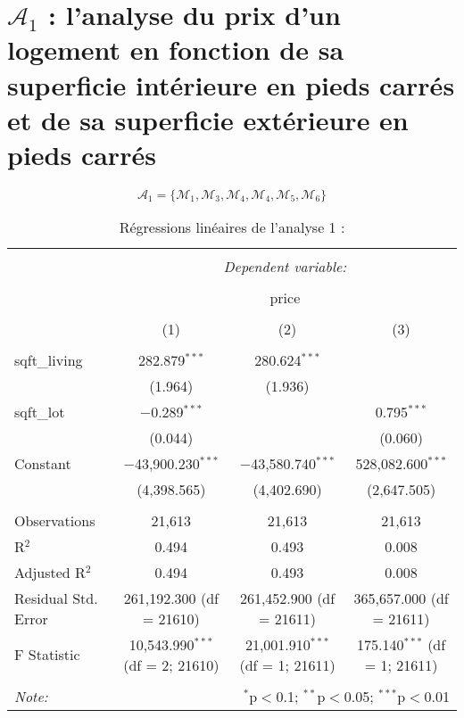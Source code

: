 \documentclass[
  11pt,
  french,
]{article}
\begin{document}
\newpage

\hypertarget{mathcala_1-lanalyse-du-prix-dun-logement-en-fonction-de-sa-superficie-intuxe9rieure-en-pieds-carruxe9s-et-de-sa-superficie-extuxe9rieure-en-pieds-carruxe9s}{%
\section{\texorpdfstring{\(\mathcal{A}_{1}\) : l'analyse du prix d'un
logement en fonction de sa superficie intérieure en pieds carrés et de
sa superficie extérieure en pieds
carrés}{\textbackslash mathcal\{A\}\_\{1\} : l'analyse du prix d'un logement en fonction de sa superficie intérieure en pieds carrés et de sa superficie extérieure en pieds carrés}}\label{mathcala_1-lanalyse-du-prix-dun-logement-en-fonction-de-sa-superficie-intuxe9rieure-en-pieds-carruxe9s-et-de-sa-superficie-extuxe9rieure-en-pieds-carruxe9s}}

\[\mathcal{A}_{1}=\{\mathcal{M}_{1},\mathcal{M}_{3},\mathcal{M}_{4},\mathcal{M}_{4},\mathcal{M}_{5},\mathcal{M}_{6}\}\]

\begin{table}[!htbp] \centering 
  \caption{Régressions linéaires de l'analyse 1 :} 
  \label{} 
\small 
\begin{tabular}{@{\extracolsep{1pt}}lccc} 
\\[-1.8ex]\hline 
\hline \\[-1.8ex] 
 & \multicolumn{3}{c}{\textit{Dependent variable:}} \\ 
\cline{2-4} 
\\[-1.8ex] & \multicolumn{3}{c}{price} \\ 
\\[-1.8ex] & (1) & (2) & (3)\\ 
\hline \\[-1.8ex] 
 sqft\_living & 282.879$^{***}$ & 280.624$^{***}$ &  \\ 
  & (1.964) & (1.936) &  \\ 
  sqft\_lot & $-$0.289$^{***}$ &  & 0.795$^{***}$ \\ 
  & (0.044) &  & (0.060) \\ 
  Constant & $-$43,900.230$^{***}$ & $-$43,580.740$^{***}$ & 528,082.600$^{***}$ \\ 
  & (4,398.565) & (4,402.690) & (2,647.505) \\ 
 \hline \\[-1.8ex] 
Observations & 21,613 & 21,613 & 21,613 \\ 
R$^{2}$ & 0.494 & 0.493 & 0.008 \\ 
Adjusted R$^{2}$ & 0.494 & 0.493 & 0.008 \\ 
Residual Std. Error & 261,192.300 (df = 21610) & 261,452.900 (df = 21611) & 365,657.000 (df = 21611) \\ 
F Statistic & 10,543.990$^{***}$ (df = 2; 21610) & 21,001.910$^{***}$ (df = 1; 21611) & 175.140$^{***}$ (df = 1; 21611) \\ 
\hline 
\hline \\[-1.8ex] 
\textit{Note:}  & \multicolumn{3}{r}{$^{*}$p$<$0.1; $^{**}$p$<$0.05; $^{***}$p$<$0.01} \\ 
\end{tabular} 
\end{table}
\end{document}
